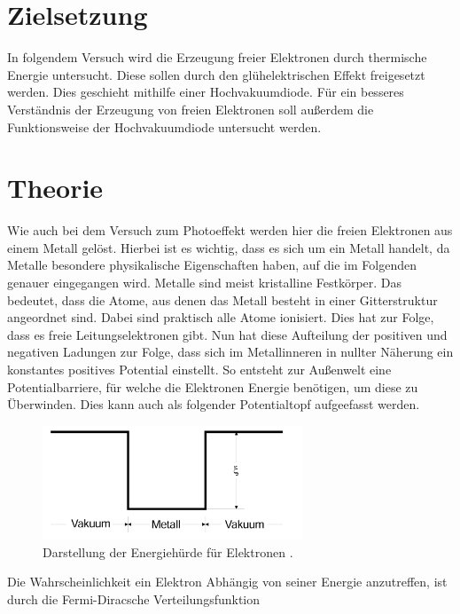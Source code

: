 


\section{Zielsetzung}
\label{sec:Theorie}

In folgendem Versuch wird die Erzeugung freier Elektronen durch thermische Energie untersucht. Diese sollen durch den 
glühelektrischen Effekt freigesetzt werden. Dies geschieht mithilfe einer Hochvakuumdiode. Für ein besseres Verständnis 
der Erzeugung von freien Elektronen soll außerdem die Funktionsweise der Hochvakuumdiode untersucht werden. 

\section{Theorie \cite{Versuchsanleitung_v504}}

Wie auch bei dem Versuch zum Photoeffekt werden hier die freien Elektronen aus einem Metall gelöst. Hierbei ist es 
wichtig, dass es sich um ein Metall handelt, da Metalle besondere physikalische Eigenschaften haben, auf die im 
Folgenden genauer eingegangen wird. Metalle sind meist kristalline Festkörper. Das bedeutet, dass die Atome, aus denen 
das Metall besteht in einer Gitterstruktur angeordnet sind. Dabei sind praktisch alle Atome ionisiert. Dies hat zur Folge, 
dass es freie Leitungselektronen gibt. Nun hat diese Aufteilung der positiven und negativen Ladungen zur Folge, dass sich 
im Metallinneren in nullter Näherung ein konstantes positives Potential einstellt. So entsteht zur Außenwelt eine 
Potentialbarriere, für welche die Elektronen Energie benötigen, um diese zu Überwinden. Dies kann auch als folgender 
Potentialtopf aufgeefasst werden.

\begin{figure}
    \centering
    \includegraphics[width=0.69\textwidth]{Potentialtopf.png}
    \caption{Darstellung der Energiehürde für Elektronen \cite{Versuchsanleitung_v504}.}
\end{figure}

\noindent Die Wahrscheinlichkeit ein Elektron Abhängig von seiner Energie anzutreffen, ist durch die Fermi-Diracsche 
Verteilungsfunktion 

